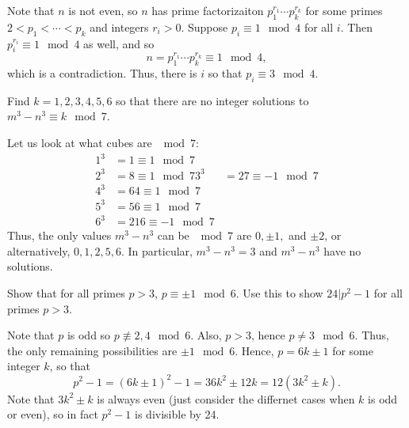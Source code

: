 \documentclass[11pt,dvipsnames]{book}
\numberwithin{equation}{section} %
\numberwithin{figure}{section} %
\numberwithin{table}{section} %
\begin{document}
\begin{exercise}
\begin{exercise}
\begin{solution}
Note that $n$ is not even, so $n$ has prime factorizaiton $p_{1}^{r_{1}}\cdots p_{k}^{r_{k}}$ for some primes $2<p_{1}<\cdots < p_{k}$ and integers $r_{i}>0$. Suppose $p_{i}\equiv 1 \mod 4$ for all $i$. Then $p_{i}^{r_{i}}\equiv 1 \mod 4$ as well, and so
\[
n=p_{1}^{r_{1}}\cdots p_{k}^{r_{k}}\equiv 1 \mod 4,
\]
which is a contradiction. Thus, there is $i$ so that $p_{i}\equiv 3\mod 4$.


\end{solution}

\end{exercise}

\begin{exercise}
Find $k=1,2,3,4,5,6$ so that there are no integer solutions to $m^3-n^3\equiv k\mod 7$.

\begin{solution}
Let us look at what cubes are $\mod 7$:
\begin{align*}
1^3 & =1\equiv 1 \mod 7 \\
2^3 & =8 \equiv 1 \mod 7
3^3 & =27 \equiv -1 \mod 7 \\
4^3 & =64 \equiv 1 \mod 7\\
5^3 & =56\equiv 1 \mod 7\\
6^3 & = 216 \equiv -1 \mod 7
\end{align*}
Thus, the only values $m^3-n^3$ can be $\mod 7$ are $0,\pm 1,$ and $\pm 2$, or alternatively, $0,1,2,5,6$. In particular, $m^3-n^3=3$ and $m^3-n^3$ have no solutions.

\end{solution}

\end{exercise}



\begin{exercise} Show that for all primes $p>3$, $p\equiv \pm 1\mod 6$. Use this to show $24|p^2-1$ for all primes $p>3$.

\begin{solution}
Note that $p$ is odd so $p\not\equiv 2,4\mod 6$. Also, $p>3$, hence $p\neq 3\mod 6$. Thus, the only remaining possibilities are $\pm 1 \mod  6$. Hence, $p=6k\pm 1$ for some integer $k$, so that
\[
p^2-1 = (6k\pm 1)^2-1=36k^2\pm 12k=12(3k^2\pm k).
\]
Note that $3k^2\pm k$ is always even (just consider the differnet cases when $k$ is odd or even), so in fact $p^2-1$ is divisible by 24. 



\end{solution}


\end{exercise}
\end{exercise}
\end{document}
